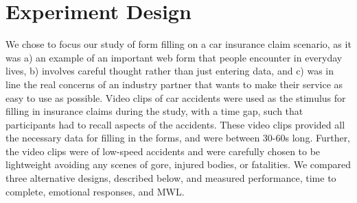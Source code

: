 \documentclass[../main/Feedback.tex]{subfiles}
\begin{document}
\section{Experiment Design}
We chose to focus our study of form filling on a car insurance claim scenario, as it was a) an example of an important web form that people encounter in everyday lives, b) involves careful thought rather than just entering data, and c) was in line the real concerns of an industry partner that wants to make their service as easy to use as possible. Video clips of car accidents were used as the stimulus for filling in insurance claims during the study, with a time gap, such that participants had to recall aspects of the accidents. These video clips provided all the necessary data for filling in the forms, and were between 30-60s long.
Further, the video clips were of low-speed accidents and were carefully chosen to be lightweight avoiding any scenes of gore, injured bodies, or fatalities. We compared three alternative designs, described below, and measured performance, time to complete, emotional responses, and MWL.
\end{document}
